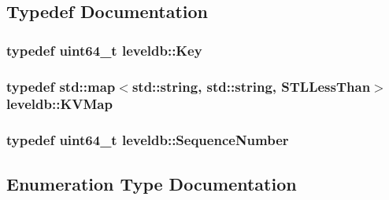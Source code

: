 \subsection{Typedef Documentation}
\hypertarget{namespaceleveldb_a7e9a9725b13fa0bd922d885280dfab95}{}
\subsubsection[{Key}]{\setlength{\rightskip}{0pt plus 5cm}typedef {\bf uint64\+\_\+t} {\bf leveldb\+::\+Key}}\label{namespaceleveldb_a7e9a9725b13fa0bd922d885280dfab95}
\hypertarget{namespaceleveldb_aac1e50450147be263e08252c6700f7a7}{}
\subsubsection[{K\+V\+Map}]{\setlength{\rightskip}{0pt plus 5cm}typedef std\+::map$<$std\+::string, std\+::string, S\+T\+L\+Less\+Than$>$ {\bf leveldb\+::\+K\+V\+Map}}\label{namespaceleveldb_aac1e50450147be263e08252c6700f7a7}
\hypertarget{namespaceleveldb_a5481ededd221c36d652c371249f869fa}{}
\subsubsection[{Sequence\+Number}]{\setlength{\rightskip}{0pt plus 5cm}typedef {\bf uint64\+\_\+t} {\bf leveldb\+::\+Sequence\+Number}}\label{namespaceleveldb_a5481ededd221c36d652c371249f869fa}


\subsection{Enumeration Type Documentation}
\hypertarget{namespaceleveldb_a047a8e77a76becb82bab4720994f6f9b}{}
